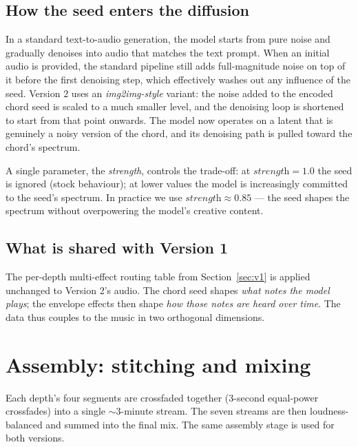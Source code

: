\documentclass[11pt, a4paper]{article}
\begin{document}
\subsection{How the seed enters the diffusion}

In a standard text-to-audio generation, the model starts from pure noise
and gradually denoises into audio that matches the text prompt. When an
initial audio is provided, the standard pipeline still adds full-magnitude
noise on top of it before the first denoising step, which effectively
washes out any influence of the seed. Version 2 uses an
\emph{img2img-style} variant: the noise added to the encoded chord seed is
scaled to a much smaller level, and the denoising loop is shortened to
start from that point onwards. The model now operates on a latent that is
genuinely a noisy version of the chord, and its denoising path is pulled
toward the chord's spectrum.

A single parameter, the \emph{strength}, controls the trade-off: at
$\textit{strength}=1.0$ the seed is ignored (stock behaviour); at lower
values the model is increasingly committed to the seed's spectrum. In
practice we use $\textit{strength} \approx 0.85$ --- the seed shapes the
spectrum without overpowering the model's creative content.

\subsection{What is shared with Version 1}

The per-depth multi-effect routing table from Section~\ref{sec:v1} is
applied unchanged to Version 2's audio. The chord seed shapes \emph{what
notes the model plays}; the envelope effects then shape \emph{how those
notes are heard over time}. The data thus couples to the music in two
orthogonal dimensions.

\clearpage

\section{Assembly: stitching and mixing}

Each depth's four segments are crossfaded together (3-second equal-power
crossfades) into a single $\sim 3$-minute stream. The seven streams are
then loudness-balanced and summed into the final mix. The same assembly
stage is used for both versions.
\end{document}
